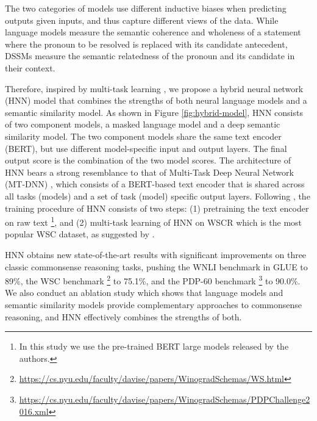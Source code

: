 \documentclass[11pt,a4paper]{article}
\newcommand{\wsc}{WSC}
\begin{document}
The two categories of models use different inductive biases when predicting outputs given inputs, and thus capture different views of the data. While language models measure the semantic coherence and wholeness of a statement where the pronoun to be resolved is replaced with its candidate antecedent, DSSMs measure the semantic relatedness of the pronoun and its candidate in their context. 

Therefore, inspired by multi-task learning \cite{caruana1997multitask,liu2015mtl,liu2019multi}, we propose a hybrid neural network (HNN) model that combines the strengths of both neural language models and a semantic similarity model. 
As shown in Figure \ref{fig:hybrid-model}, HNN consists of two component models, a masked language model and a deep semantic similarity model. The two component models share the same text encoder (BERT), but use different model-specific input and output layers. The final output score is the combination of the two model scores. 
The architecture of HNN bears a strong resemblance to that of Multi-Task Deep Neural Network (MT-DNN) \cite{liu2019multi}, which consists of a BERT-based text encoder that is shared across all tasks (models) and a set of task (model) specific output layers.  
Following \cite{liu2019multi,kocijan2019surprisingly}, the training procedure of HNN consists of two steps: (1) pretraining the text encoder on raw text \footnote {In this study we use the pre-trained BERT large models released by the authors.}, and (2) multi-task learning of HNN on WSCR which is the most popular WSC dataset, as suggested by \citet{kocijan2019surprisingly}.

HNN obtains new state-of-the-art results with significant improvements on three classic commonsense reasoning tasks, pushing the WNLI benchmark in GLUE to 89\%, 
the {\wsc} benchmark \footnote{\url{https://cs.nyu.edu/faculty/davise/papers/WinogradSchemas/WS.html}} 
\cite{levesque2011winograd} to 75.1\%, 
and the PDP-60 benchmark \footnote{\url{https://cs.nyu.edu/faculty/davise/papers/WinogradSchemas/PDPChallenge2016.xml}} 
to 90.0\%.
We also conduct an ablation study which shows that language models and semantic similarity models provide complementary approaches to commonsense reasoning, and HNN effectively combines the strengths of both.

 
\end{document}
